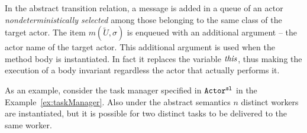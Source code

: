 \documentclass{LMCS}
\theoremstyle{plain}\newtheorem{proposition}[thm]{Proposition}
\theoremstyle{plain}\newtheorem{lemma}[thm]{Lemma}
\theoremstyle{plain}\newtheorem{theorem}[thm]{Theorem}
\theoremstyle{plain}\newtheorem{corollary}[thm]{Corollary}
\newcommand{\wt}[1]{\widetilde{#1}}
\newcommand{\actsl}{${\tt Actor^{\tt sl}}$}
\begin{document}
In the abstract transition relation, a message is added in a queue
of an actor \emph{nondeterministically selected}
among those belonging to the
same class of the target actor. The item $m(\wt{U},\sigma)$ is enqueued 
with an additional argument -- the actor name of the target actor. 
This additional argument is used when the method body is instantiated. In fact
it replaces the variable ${\it this}$, thus making the execution
of a body invariant regardless the actor that actually performs it.














As an example, consider the task manager specified
in {\actsl} in the Example~\ref{ex:taskManager}.
Also under the abstract semantics $n$ distinct workers
are instantiated, but it is possible for two distinct
tasks to be delivered to the same worker.
\end{document}
